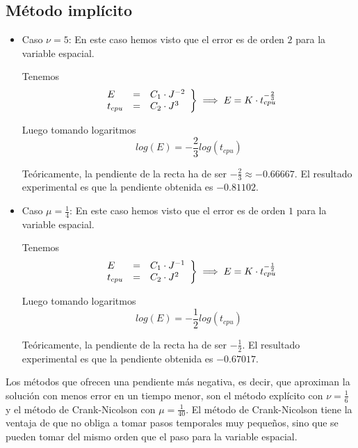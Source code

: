 \documentclass[spanish]{mathnotes}
\begin{document}
	\subsection{Método implícito}
	\begin{itemize}
		\item Caso $\nu = 5$: En este caso hemos visto que el error es de orden $2$ para la variable espacial.
		
		Tenemos 
		\begin{equation*}
			\left.
			\begin{array}{l l l}
				E &=& C_1 \cdot J^{-2}\\
				t_{cpu} &=& C_2 \cdot J^3
			\end{array}
			\right\} \implies E = K\cdot  t_{cpu}^{-\frac{2}{3}}
		\end{equation*}
		
		Luego tomando logaritmos
		$$log(E) = -\frac{2}{3}log(t_{cpu})$$
		
		Teóricamente, la pendiente de la recta ha de ser $-\frac{2}{3} \approx -0.66667$. El resultado experimental es que la pendiente obtenida es $-0.81102$.
		
		\item Caso $\mu = \frac{1}{4}$: En este caso hemos visto que el error es de orden $1$ para la variable espacial.
		
		Tenemos 
		\begin{equation*}
			\left.
			\begin{array}{l l l}
				E &=& C_1 \cdot J^{-1}\\
				t_{cpu} &=& C_2 \cdot J^2
			\end{array}
			\right\} \implies E = K\cdot  t_{cpu}^{-\frac{1}{2}}
		\end{equation*}
		
		Luego tomando logaritmos
		$$log(E) = -\frac{1}{2}log(t_{cpu})$$
		
		Teóricamente, la pendiente de la recta ha de ser $-\frac{1}{2}$. El resultado experimental es que la pendiente obtenida es $-0.67017$.
	\end{itemize}	
	
	Los métodos que ofrecen una pendiente más negativa, es decir, que aproximan la solución con menos error en un tiempo menor, son el método explícito con $\nu = \frac{1}{6}$ y el método de Crank-Nicolson con $\mu = \frac{1}{40}$. El método de Crank-Nicolson tiene la ventaja de que no obliga a tomar pasos temporales muy pequeños, sino que se pueden tomar del mismo orden que el paso para la variable espacial.
\end{document}
